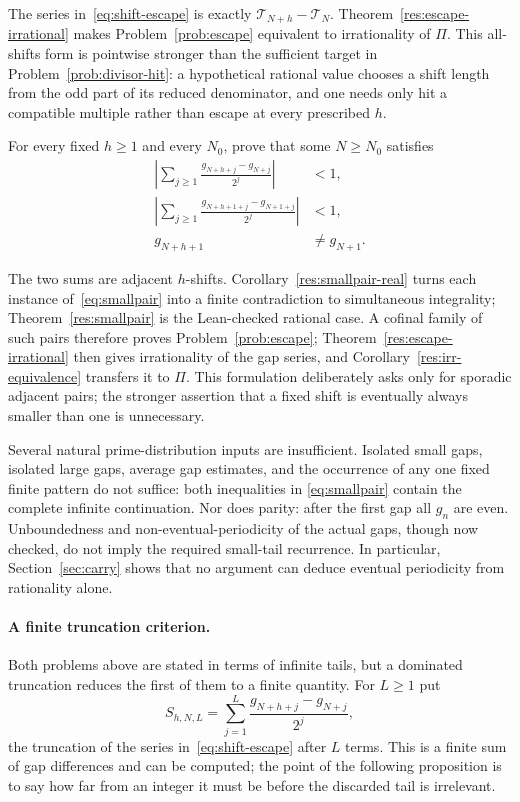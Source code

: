 \documentclass[11pt]{article}
\begin{document}
The series in~\eqref{eq:shift-escape} is exactly
$\mathcal T_{N+h}-\mathcal T_N$.  Theorem~\ref{res:escape-irrational} makes
Problem~\ref{prob:escape} equivalent to irrationality of $\Pi$.  This
all-shifts form is pointwise stronger than the sufficient target in
Problem~\ref{prob:divisor-hit}: a hypothetical rational value chooses a shift
length from the odd part of its reduced denominator, and one needs only hit a
compatible multiple rather than escape at every prescribed $h$.

\begin{problem}\label{prob:smallpair}
For every fixed $h\ge1$ and every $N_0$, prove that some $N\ge N_0$ satisfies
\[
\begin{split}
\left|\sum_{j\ge1}
 \frac{g_{N+h+j}-g_{N+j}}{2^j}\right|&<1,\\
\left|\sum_{j\ge1}
 \frac{g_{N+h+1+j}-g_{N+1+j}}{2^j}\right|&<1,\\
g_{N+h+1}&\ne g_{N+1}.
\end{split}
\tag{5.2}\label{eq:smallpair}
\]
\end{problem}

The two sums are adjacent $h$-shifts.  Corollary~\ref{res:smallpair-real} turns
each instance of~\eqref{eq:smallpair} into a finite contradiction to
simultaneous integrality; Theorem~\ref{res:smallpair} is the Lean-checked
rational case.  A cofinal family of such pairs therefore proves
Problem~\ref{prob:escape}; Theorem~\ref{res:escape-irrational} then gives irrationality
of the gap series, and Corollary~\ref{res:irr-equivalence} transfers it to
$\Pi$.  This formulation deliberately asks only for sporadic adjacent pairs;
the stronger assertion that a fixed shift is eventually always smaller than
one is unnecessary.

Several natural prime-distribution inputs are insufficient.  Isolated
small gaps, isolated large gaps, average gap estimates, and the occurrence of
any one fixed finite pattern do not suffice: both inequalities in
\eqref{eq:smallpair} contain the complete infinite continuation.  Nor
does parity: after the first gap all $g_n$ are even.  Unboundedness and
non-eventual-periodicity of the actual gaps, though now checked, do not imply
the required small-tail recurrence.  In particular, Section~\ref{sec:carry}
shows that no argument can deduce eventual periodicity from rationality alone.

\paragraph{A finite truncation criterion.}
Both problems above are stated in terms of infinite tails, but a dominated
truncation reduces the first of them to a finite quantity.  For $L\ge1$ put
\[
 S_{h,N,L}=\sum_{j=1}^{L}
 \frac{g_{N+h+j}-g_{N+j}}{2^j},
\]
the truncation of the series in~\eqref{eq:shift-escape} after $L$ terms.  This
is a finite sum of gap differences and can be computed; the point of the
following proposition is to say how far from an integer it must be before the
discarded tail is irrelevant.
\end{document}
